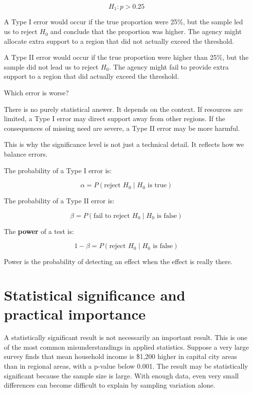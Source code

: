 \documentclass[
  letterpaper,
  DIV=11,
  numbers=noendperiod]{scrreprt}
\begin{document}
\[
H_1: p > 0.25
\]

A Type I error would occur if the true proportion were 25\%, but the
sample led us to reject \(H_0\) and conclude that the proportion was
higher. The agency might allocate extra support to a region that did not
actually exceed the threshold.

A Type II error would occur if the true proportion were higher than
25\%, but the sample did not lead us to reject \(H_0\). The agency might
fail to provide extra support to a region that did actually exceed the
threshold.

Which error is worse?

There is no purely statistical answer. It depends on the context. If
resources are limited, a Type I error may direct support away from other
regions. If the consequences of missing need are severe, a Type II error
may be more harmful.

This is why the significance level is not just a technical detail. It
reflects how we balance errors.

The probability of a Type I error is:

\[
\alpha = P(\text{reject } H_0 \mid H_0 \text{ is true})
\]

The probability of a Type II error is:

\[
\beta = P(\text{fail to reject } H_0 \mid H_0 \text{ is false})
\]

The \textbf{power} of a test is:

\[
1 - \beta = P(\text{reject } H_0 \mid H_0 \text{ is false})
\]

Power is the probability of detecting an effect when the effect is
really there.

\section{Statistical significance and practical
importance}\label{statistical-significance-and-practical-importance}

A statistically significant result is not necessarily an important
result. This is one of the most common misunderstandings in applied
statistics. Suppose a very large survey finds that mean household income
is \$1,200 higher in capital city areas than in regional areas, with a
p-value below 0.001. The result may be statistically significant because
the sample size is large. With enough data, even very small differences
can become difficult to explain by sampling variation alone.
\end{document}
